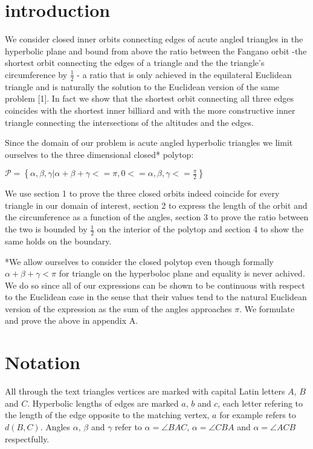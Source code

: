 \documentclass[a4paper,10pt]{article}
\title{}
\author{}
\begin{document}
\maketitle
\section{introduction}

We consider closed inner orbits connecting edges of acute angled triangles in the
hyperbolic plane and bound from above the ratio between the Fangano orbit -the
shortest orbit connecting the edges of a triangle and the the triangle's
circumference by $\frac{1}{2}$ - a ratio that is only achieved in the equilateral
Euclidean triangle and is naturally the solution to the Euclidean version of the
same problem [1].
In fact we show that the shortest orbit connecting all three edges coincides with
the shortest inner billiard and with the more constructive inner triangle 
connecting the intersections of the altitudes and the edges.

Since the domain of our problem is acute angled hyperbolic triangles we
limit ourselves to the three dimensional closed* polytop:

\begin{center}
   $\mathcal{P} = \left\{\alpha,\beta,\gamma| \alpha + \beta + \gamma <= \pi, 0 <= \alpha,\beta,\gamma <= \frac{\pi}{2}\right\}$
\end{center}

We use section 1 to prove the three closed orbits indeed coincide for
every triangle in our domain of interest, section 2 to express the length of
the orbit and the circumference as a function of the angles, section 3
to prove the ratio between the two is bounded by $\frac{1}{2}$ on the
interior of the polytop and section 4 to show the same holds on the
boundary.


*We allow ourselves to consider the closed polytop even though formally
$\alpha + \beta + \gamma < \pi$ for triangle on the hyperboloc plane and 
equality is never achived. We do so since all of our expressions can be shown
to be continuous with respect to the Euclidean case in the sense that their 
values tend to the natural Euclidean version of the expression as the
sum of the angles approaches $\pi$. We formulate and prove the above in
appendix A.

\section{Notation}
All through the text triangles vertices are marked with capital Latin
letters $A$, $B$ and $C$. Hyperbolic lengths of edges are marked $a$,
$b$ and $c$, each letter refering to the length of the edge opposite
to the matching vertex, $a$ for example refers to $d\left(B, C\right)$.
Angles $\alpha$, $\beta$ and $\gamma$ refer to $\alpha = \angle BAC$, 
$\alpha = \angle CBA$ and $\alpha = \angle ACB$ respectfully.
\end{document}
